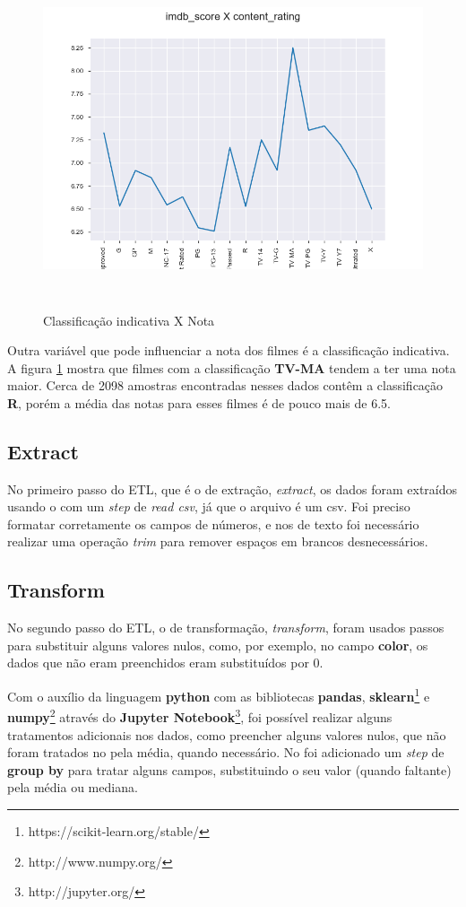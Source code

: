 \begin{figure}[H]
\centering
\includegraphics[height=10cm]{imagens/scoreXcontent.png}
\caption{Classificação indicativa X Nota}
\label{ratingXscore}
\end{figure}
Outra variável que pode influenciar a nota dos filmes é a classificação indicativa. A figura \ref{ratingXscore} mostra que filmes com a classificação \textbf{TV-MA} tendem a ter uma nota maior. Cerca de 2098 amostras encontradas nesses dados contêm a classificação \textbf{R}, porém a média das notas para esses filmes é de pouco mais de 6.5.

\subsection{Extract}
No primeiro passo do ETL, que é o de extração, \textit{extract}, os dados foram extraídos usando o \pdi com um \textit{step} de \textit{read csv}, já que o arquivo é um csv. Foi preciso formatar corretamente os campos de números, e nos de texto foi necessário realizar uma operação \textit{trim} para remover espaços em brancos desnecessários. 

\subsection{Transform}
No segundo passo do ETL, o de transformação, \textit{transform}, foram usados passos para substituir alguns valores nulos, como, por exemplo, no campo \textbf{color}, os dados que não eram preenchidos eram substituídos por 0. 

Com o auxílio da linguagem \textbf{python} com as bibliotecas \textbf{pandas}, \textbf{sklearn}\footnote{https://scikit-learn.org/stable/} e \textbf{numpy}\footnote{http://www.numpy.org/} através do \textbf{Jupyter Notebook}\footnote{http://jupyter.org/}, foi possível realizar alguns tratamentos adicionais nos dados, como preencher alguns valores nulos, que não foram tratados no \pdi pela média, quando necessário. No \pdi foi adicionado um \textit{step} de \textbf{group by} para tratar alguns campos, substituindo o seu valor (quando faltante) pela média ou mediana. 

